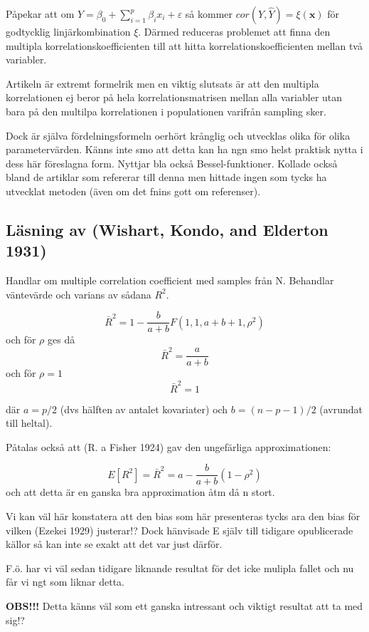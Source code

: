 \documentclass[]{article}
\begin{document}
Påpekar att om
\(Y = \beta_0 + \sum_{i = 1}^p \beta_i x_i + \varepsilon\) så kommer
\(cor(Y, \hat{Y}) = \xi(\mathbf{x})\) för godtycklig linjärkombination
\(\xi\). Därmed reduceras problemet att finna den multipla
korrelationskoefficienten till att hitta korrelationskoefficienten
mellan två variabler.

Artikeln är extremt formelrik men en viktig slutsats är att den multipla
korrelationen ej beror på hela korrelationsmatrisen mellan alla
variabler utan bara på den multilpa korrelationen i populationen
varifrån sampling sker.

Dock är själva fördelningsformeln oerhört krånglig och utvecklas olika
för olika parametervärden. Känns inte smo att detta kan ha ngn smo helst
praktisk nytta i dess här föreslagna form. Nyttjar bla också
Bessel-funktioner. Kollade också bland de artiklar som refererar till
denna men hittade ingen som tycks ha utvecklat metoden (även om det
fnins gott om referenser).

\subsection{Läsning av (Wishart, Kondo, and Elderton
1931)}\label{lasning-av-wishart1931}

Handlar om multiple correlation coefficient med samples från N.
Behandlar väntevärde och varians av sådana \(R^2\).

\[\bar{R}^2 = 1 - \frac{b}{a + b}F(1, 1, a+b+1, \rho^2)\] och för
\(\rho\) ges då \[\bar{R}^2 = \frac{a}{a + b}\] och för \(\rho = 1\)
\[\bar{R}^2 = 1\]

där \(a = p/2\) (dvs hälften av antalet kovariater) och
\(b = (n - p - 1)/2\) (avrundat till heltal).

Påtalas också att (R. a Fisher 1924) gav den ungefärliga
approximationen:

\[E[R^2] = \bar{R}^2 = a - \frac{b}{a + b}(1-\rho^2)\] och att detta är
en ganska bra approximation åtm då n stort.

Vi kan väl här konstatera att den bias som här presenteras tycks ara den
bias för vilken (Ezekei 1929) justerar!? Dock hänvisade E själv till
tidigare opublicerade källor så kan inte se exakt att det var just
därför.

F.ö. har vi väl sedan tidigare liknande resultat för det icke mulipla
fallet och nu får vi ngt som liknar detta.

\textbf{OBS!!!} Detta känns väl som ett ganska intressant och viktigt
resultat att ta med sig!?
\end{document}
